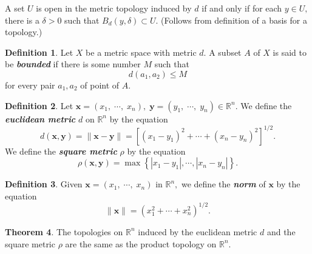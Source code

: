 \documentclass{article}
\theoremstyle{definition}
\newtheorem{theorem}{Theorem}[section]
\newtheorem{defn}[theorem]{Definition}
\begin{document}
A set $U$ is open in the metric topology induced by $d$ if and only if for each $y\in U,$ there is a $\delta > 0$ such that $B_d(y, \delta) \subset U.$ (Follows from definition of a basis for a topology.)\\
%
\begin{defn} 
  Let $X$ be a metric space with metric $d.$ A subset $A$ of $X$ is said to be \textbf{\emph{bounded}} if there is some number $M$ such that
  \[d(a_1, a_2) \le M\]
  for every pair $a_1, a_2$ of point of $A.$
\end{defn}
%
\begin{defn} 
  Let $\mathbf{x}=\left(x_{1},\; \cdots,\; x_{n}\right),\; \mathbf{y} = \left(y_{1},\; \cdots,\; y_{n}\right) \in \mathbb{R}^n.$
  We define the \textbf{\emph{euclidean metric}} $d$ on $\mathbb{R}^n$ by the equation
  \[d(\mathbf{x}, \mathbf{y})=\|\mathbf{x}-\mathbf{y}\|=\left[\left(x_{1}-y_{1}\right)^{2}+\cdots+\left(x_{n}-y_{n}\right)^{2}\right]^{1 / 2}.\]
  We define the \textbf{\emph{square metric}} $\rho$ by the equation
  \[\rho(\mathbf{x}, \mathbf{y})=\max \left\{\left|x_{1}-y_{1}\right|, \cdots,\left|x_{n}-y_{n}\right|\right\}.\]
\end{defn}
%
\begin{defn}
  Given $\textbf{x} = (x_1,\;\cdots,\; x_n)$ in $\mathbb{R}^n,$ we define the \textbf{\emph{norm}} of $\textbf{x}$ by the equation
  \[\|\textbf{x}\| = \left(x_1^2 + \cdots + x_n^2\right)^{1/2}.\]
\end{defn}
%
\begin{theorem} 
  The topologies on $\mathbb{R}^n$ induced by the euclidean metric $d$ and the square metric $\rho$ are the same as the product topology on $\mathbb{R}^n.$
\end{theorem}
\end{document}
